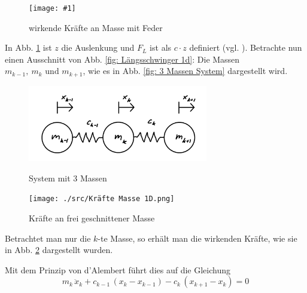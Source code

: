 \documentclass[a4paper,12pt]{report}
\newcommand{\bild}[4]{
      \begin{figure}[!htp]
            \centering
            \texttt{[image: \#1]}
            \caption{#3}
            #4
      \end{figure}
}
\theoremstyle{plain} %
\theoremstyle{definition} %
\theoremstyle{remark}
\begin{document}
            \bild{Federkraft und Trägheitskraft.png}{0.4}{wirkende Kräfte an Masse mit Feder \cite{federkraft}}{\label{fig: KräfteAnFeder}}
            
            In Abb. \ref{fig: KräfteAnFeder} ist $z$ die Auslenkung und $F_L$ ist als $c\cdot z$ definiert (vgl. \cite{federkraft}).
            Betrachte nun einen Ausschnitt von Abb. \ref{fig: Längsschwinger 1d}: Die Massen $m_{k-1},\ m_k\text{ und }m_{k+1}$, wie es in Abb. \ref{fig: 3 Massen System} dargestellt wird.

            \begin{figure}[ht]
                  \centering
                  \begin{minipage}[ht]{0.49\linewidth}
                        \centering
                        \includegraphics[width=0.7\textwidth, keepaspectratio]{./src/3 Massen System.png}
                        \caption{System mit 3 Massen}
                        \label{fig: 3 Massen System}
                  \end{minipage}
                  \hfill
                  \begin{minipage}[ht]{0.49\linewidth}
                        \centering
                        \texttt{[image: ./src/Kräfte Masse 1D.png]}
                        \caption{Kräfte an frei geschnittener Masse}
                        \label{fig: Kräfte Masse 1D}
                  \end{minipage}
            \end{figure}

            Betrachtet man nur die $k$-te Masse, so erhält man die wirkenden Kräfte, wie sie in Abb. \ref{fig: Kräfte Masse 1D} dargestellt wurden.

            Mit dem Prinzip von d'Alembert führt dies auf die Gleichung
            \begin{equation}
                  \label{eqn: Gl für kte Masse}
                  m_k\,\ddot x_k + c_{k-1}\,(x_k-x_{k-1}) - c_k\,(x_{k+1}-x_k) = 0
            \end{equation}
\end{document}
